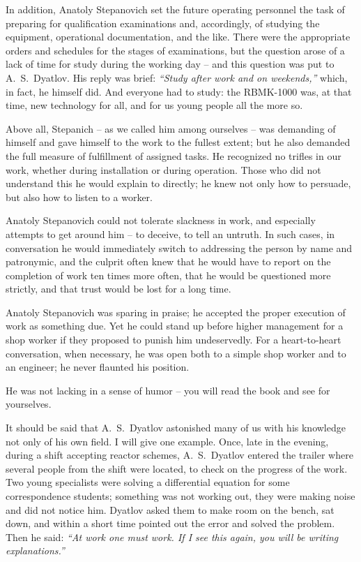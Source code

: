 \documentclass[openright]{bookest}
\begin{document}
In addition, Anatoly Stepanovich set the future operating personnel the task of preparing for qualification examinations and, accordingly, of studying the equipment, operational documentation, and the like. There were the appropriate orders and schedules for the stages of examinations, but the question arose of a lack of time for study during the working day -- and this question was put to A.~S.~Dyatlov. His reply was brief: \textit{``Study after work and on weekends,''} which, in fact, he himself did. And everyone had to study: the RBMK-1000 was, at that time, new technology for all, and for us young people all the more so.

Above all, Stepanich -- as we called him among ourselves -- was demanding of himself and gave himself to the work to the fullest extent; but he also demanded the full measure of fulfillment of assigned tasks. He recognized no trifles in our work, whether during installation or during operation. Those who did not understand this he would explain to directly; he knew not only how to persuade, but also how to listen to a worker.

Anatoly Stepanovich could not tolerate slackness in work, and especially attempts to get around him -- to deceive, to tell an untruth. In such cases, in conversation he would immediately switch to addressing the person by name and patronymic, and the culprit often knew that he would have to report on the completion of work ten times more often, that he would be questioned more strictly, and that trust would be lost for a long time.

Anatoly Stepanovich was sparing in praise; he accepted the proper execution of work as something due. Yet he could stand up before higher management for a shop worker if they proposed to punish him undeservedly. For a heart-to-heart conversation, when necessary, he was open both to a simple shop worker and to an engineer; he never flaunted his position.

He was not lacking in a sense of humor -- you will read the book and see for yourselves.

It should be said that A.~S.~Dyatlov astonished many of us with his knowledge not only of his own field. I will give one example. Once, late in the evening, during a shift accepting reactor schemes, A.~S.~Dyatlov entered the trailer where several people from the shift were located, to check on the progress of the work. Two young specialists were solving a differential equation for some correspondence students; something was not working out, they were making noise and did not notice him. Dyatlov asked them to make room on the bench, sat down, and within a short time pointed out the error and solved the problem. Then he said: \textit{``At work one must work. If I see this again, you will be writing explanations.''}
\end{document}
